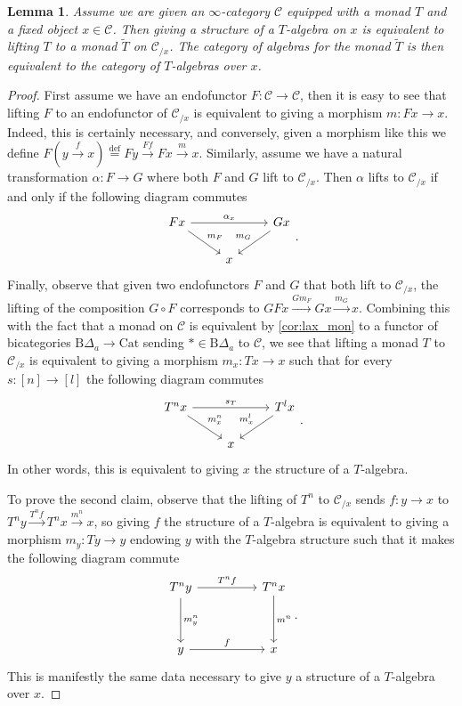 \documentclass[a4paper, reqno]{amsart}
\newtheorem{lemma}[theorem]{Lemma}
\theoremstyle{definition}
\newcommand\cC{\mathscr C}
\newcommand\rB{\mathrm B}
\newcommand\cat{\mathrm{Cat}}
\newcommand\bydef{\overset{\mathrm{def}}{=}}
\begin{document}
\begin{lemma}\label{lem:mon_slice}
Assume we are given an $\infty$-category $\cC$ equipped with a monad $T$ and a fixed object $x\in\cC$. Then giving a structure of a $T$-algebra on $x$ is equivalent to lifting $T$ to a monad $\widetilde{T}$ on $\cC_{/x}$. The category of algebras for the monad $\widetilde{T}$ is then equivalent to the category of $T$-algebras over $x$.
\end{lemma}
\begin{proof}
First assume we have an endofunctor $F:\cC\rightarrow\cC$, then it is easy to see that lifting $F$ to an endofunctor of $\cC_{/x}$ is equivalent to giving a morphism $m:Fx\rightarrow x$. Indeed, this is certainly necessary, and conversely, given a morphism like this we define $F(y\xrightarrow{f} x)\bydef Fy\xrightarrow{Ff} Fx\xrightarrow{m} x$. Similarly, assume we have a natural transformation $\alpha:F\rightarrow G$ where both $F$ and $G$ lift to $\cC_{/x}$. Then $\alpha$ lifts to $\cC_{/x}$ if and only if the following diagram commutes 
\[
\begin{tikzcd}
Fx\arrow[rr,"\alpha_x"]\arrow[dr,"m_F"]&{}&Gx\arrow[dl, "m_G" swap]\\
{}&x
\end{tikzcd}.
\]
Finally, observe that given two endofunctors $F$ and $G$ that both lift to $\cC_{/x}$, the lifting of the composition $G\circ F$ corresponds to $GFx\xrightarrow{Gm_F}Gx\xrightarrow{m_G}x$. Combining this with the fact that a monad on $\cC$ is equivalent by \cref{cor:lax_mon} to a functor of bicategories $\rB\Delta_a\rightarrow \cat$ sending $*\in\rB\Delta_a$ to $\cC$, we see that lifting a monad $T$ to $\cC_{/x}$ is equivalent to giving a morphism $m_x:Tx\rightarrow x$ such that for every $s:[n]\rightarrow[l]$ the following diagram commutes
\[
\begin{tikzcd}
T^n x\arrow[rr,"s_T"]\arrow[dr,"m_x^n"]&{}&T^l x\arrow[dl, "m_x^l" swap]\\
{}&x
\end{tikzcd}.
\]
In other words, this is equivalent to giving $x$ the structure of a $T$-algebra.\par
To prove the second claim, observe that the lifting of $T^n$ to $\cC_{/x}$ sends $f:y\rightarrow x$ to $T^n y\xrightarrow{T^n f}T^n x\xrightarrow{m^n}x$, so giving $f$ the structure of a $T$-algebra is equivalent to giving a morphism $m_y:Ty\rightarrow y$ endowing $y$ with the $T$-algebra structure such that it makes the following diagram commute
\[
\begin{tikzcd}[row sep=huge, column sep=huge]
T^n y\arrow[r, "T^n f"]\arrow[d, "m_y^n"]&T^n x\arrow[d, "m^n"]\\
y\arrow[r, "f"]&x
\end{tikzcd}.
\]
This is manifestly the same data necessary to give $y$ a structure of a $T$-algebra over $x$.
\end{proof}
\end{document}
